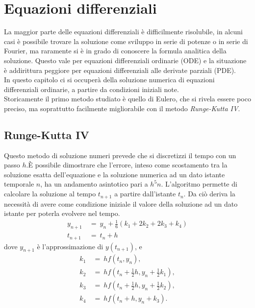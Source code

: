 \chapter{Equazioni differenziali}
La maggior parte delle equazioni differenziali è difficilmente risolubile, in alcuni casi è possibile trovare la soluzione come sviluppo in serie di potenze o
in serie di Fourier, ma raramente si è in grado di conoscere la formula analitica della soluzione. Questo vale per equazioni differenziali ordinarie (ODE)
e la situazione è addirittura peggiore per equazioni differenziali alle derivate parziali (PDE).\\
In questo capitolo ci si occuperà della soluzione numerica di equazioni differenziali ordinarie, a partire da condizioni iniziali note.\\
Storicamente il primo metodo studiato è quello di Eulero, che si rivela essere poco preciso, ma soprattutto facilmente migliorabile con 
il metodo \emph{ Runge-Kutta IV}.
\section{Runge-Kutta IV}

Questo metodo di soluzione numeri prevede che si discretizzi il tempo con un passo $h$.È possibile dimostrare che l'errore,
inteso come scostamento tra la soluzione esatta dell'equazione e la soluzione numerica ad un dato istante temporale $n$, ha un andamento asintotico
pari a $h^5 n$.
L'algoritmo permette di calcolare la soluzione al tempo $t_{n+1}$ a partire dall'istante $t_n$. Da ciò deriva la necessità di avere come condizione
iniziale il valore della soluzione ad un dato istante per poterla evolvere nel tempo.
\begin{align}
y_{n+1} \ &= \ y_n + \tfrac{1}{6} \left(k_1 + 2k_2 + 2k_3 + k_4 \right)\\
t_{n+1} \ &= \ t_n + h
\end{align}
dove $y_{n+1}$ è l'approssimazione di $y(t_{n+1})$, e
\begin{align}
k_1 \ &= \ hf(t_n, y_n),\\
k_2 \ &= \ hf(t_n + \tfrac{1}{2}h , y_n + \tfrac{1}{2} k_1),\\
k_3 \ &= \ hf(t_n + \tfrac{1}{2}h , y_n + \tfrac{1}{2} k_2),\\
k_4 \ &= \ hf(t_n + h , y_n + k_3).
\end{align}




